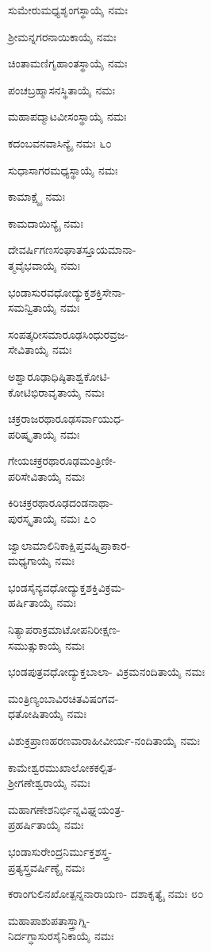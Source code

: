 ಸುಮೇರುಮಧ್ಯಶೃಂಗಸ್ಥಾಯೈ ನಮಃ

ಶ್ರೀಮನ್ನಗರನಾಯಿಕಾಯೈ ನಮಃ

ಚಿಂತಾಮಣಿಗೃಹಾಂತಸ್ಥಾಯೈ ನಮಃ

ಪಂಚಬ್ರಹ್ಮಾಸನಸ್ಥಿತಾಯೈ ನಮಃ

ಮಹಾಪದ್ಮಾಟವೀಸಂಸ್ಥಾಯೈ ನಮಃ

ಕದಂಬವನವಾಸಿನ್ಯೈ ನಮಃ \num{೬೦}

ಸುಧಾಸಾಗರಮಧ್ಯಸ್ಥಾಯೈ ನಮಃ

ಕಾಮಾಕ್ಷ್ಯೈ ನಮಃ

ಕಾಮದಾಯಿನ್ಯೈ ನಮಃ

ದೇವರ್ಷಿಗಣಸಂಘಾತಸ್ತೂಯಮಾನಾ-\\ತ್ಮವೈಭವಾಯೈ ನಮಃ

ಭಂಡಾಸುರವಧೋದ್ಯುಕ್ತಶಕ್ತಿಸೇನಾ-\\ಸಮನ್ವಿತಾಯೈ ನಮಃ

ಸಂಪತ್ಕರೀಸಮಾರೂಢಸಿಂಧುರವ್ರಜ-\\ಸೇವಿತಾಯೈ ನಮಃ

ಅಶ್ವಾರೂಢಾಧಿಷ್ಠಿತಾಶ್ವಕೋಟಿ-\\ಕೋಟಿಭಿರಾವೃತಾಯೈ ನಮಃ

ಚಕ್ರರಾಜರಥಾರೂಢಸರ್ವಾಯುಧ-\\ಪರಿಷ್ಕೃತಾಯೈ ನಮಃ

ಗೇಯಚಕ್ರರಥಾರೂಢಮಂತ್ರಿಣೀ-\\ಪರಿಸೇವಿತಾಯೈ ನಮಃ

ಕಿರಿಚಕ್ರರಥಾರೂಢದಂಡನಾಥಾ-\\ಪುರಸ್ಕೃತಾಯೈ ನಮಃ \num{೭೦}

ಜ್ವಾಲಾಮಾಲಿನಿಕಾಕ್ಷಿಪ್ತವಹ್ನಿಪ್ರಾಕಾರ-\\ಮಧ್ಯಗಾಯೈ ನಮಃ

ಭಂಡಸೈನ್ಯವಧೋದ್ಯುಕ್ತಶಕ್ತಿವಿಕ್ರಮ-\\ಹರ್ಷಿತಾಯೈ ನಮಃ

ನಿತ್ಯಾಪರಾಕ್ರಮಾಟೋಪನಿರೀಕ್ಷಣ-\\ಸಮುತ್ಸುಕಾಯೈ ನಮಃ

ಭಂಡಪುತ್ರವಧೋದ್ಯುಕ್ತಬಾಲಾ- ವಿಕ್ರಮನಂದಿತಾಯೈ ನಮಃ

ಮಂತ್ರಿಣ್ಯಂಬಾವಿರಚಿತವಿಷಂಗವ-\\ಧತೋಷಿತಾಯೈ ನಮಃ

ವಿಶುಕ್ರಪ್ರಾಣಹರಣವಾರಾಹೀವೀರ್ಯ-ನಂದಿತಾಯೈ ನಮಃ

ಕಾಮೇಶ್ವರಮುಖಾಲೋಕಕಲ್ಪಿತ-\\ಶ್ರೀಗಣೇಶ್ವರಾಯೈ ನಮಃ

ಮಹಾಗಣೇಶನಿರ್ಭಿನ್ನವಿಘ್ನಯಂತ್ರ-\\ಪ್ರಹರ್ಷಿತಾಯೈ ನಮಃ

ಭಂಡಾಸುರೇಂದ್ರನಿರ್ಮುಕ್ತಶಸ್ತ್ರ-\\ಪ್ರತ್ಯಸ್ತ್ರವರ್ಷಿಣ್ಯೈ ನಮಃ

ಕರಾಂಗುಲಿನಖೋತ್ಪನ್ನನಾರಾಯಣ- ದಶಾಕೃತ್ಯೈ ನಮಃ \num{೮೦}

ಮಹಾಪಾಶುಪತಾಸ್ತ್ರಾಗ್ನಿ-\\ನಿರ್ದಗ್ಧಾಸುರಸೈನಿಕಾಯೈ ನಮಃ

